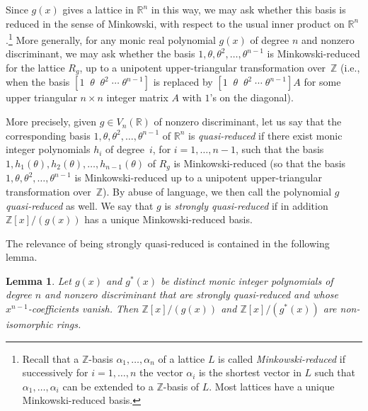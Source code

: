 \documentclass[11pt]{article}
\def\Z{{\mathbb Z}}
\def\R{{\mathbb R}}
\def\Vmn{{V_n}}
\def\Z{{\mathbb Z}}
\newtheorem{lemma}[theorem]{Lemma}
\begin{document}
Since $g(x)$ gives a lattice in $\R^n$ in this way, we may ask whether
this basis is reduced in the sense of Minkowski, with respect to the
usual inner product on $\R^n$.\footnote{Recall that a $\Z$-basis
  $\alpha_1,\ldots,\alpha_n$ of a lattice $L$ is called {\it
    Minkowski-reduced} if successively for $i=1,\ldots, n$ the vector
  $\alpha_i$ is the shortest vector in $L$ such that
  $\alpha_1,\ldots,\alpha_i$ can be extended to a $\Z$-basis of
  $L$. Most lattices have a unique Minkowski-reduced basis.}  More
generally, for any monic real polynomial $g(x)$ of degree $n$ and
nonzero discriminant, we may ask whether the basis
$1,\theta,\theta^2,\ldots,\theta^{n-1}$ is Minkowski-reduced for the
lattice $R_g$, up to a unipotent upper-triangular transformation
over~$\Z$ (i.e., when the basis $[1\;\;\theta\;\;\theta^2\;\cdots\;
  \theta^{n-1}]$ is replaced by $[1\;\;\theta\;\;\theta^2\;\cdots\;
  \theta^{n-1}]A$ for some upper triangular $n\times n$ integer matrix
$A$ with $1$'s on the diagonal).

More precisely, given $g\in \Vmn(\R)$ of nonzero discriminant, let us
say that the corresponding basis
$1,\theta,\theta^2,\ldots,\theta^{n-1}$ of $\R^n$ is {\it
  quasi-reduced} if there exist monic integer polynomials $h_i$ of
degree~$i$, for $i=1,\ldots,n-1$, such that the basis
$1,h_1(\theta),h_2(\theta),\ldots,h_{n-1}(\theta)$ of $R_g$ is
Minkowski-reduced (so that the basis
$1,\theta,\theta^2,\ldots,\theta^{n-1}$ is Minkowski-reduced up to a unipotent
upper-triangular transformation over~$\Z$). By abuse of language, we
then call the polynomial $g$ {\it quasi-reduced} as well. We say that
$g$ is {\it strongly quasi-reduced} if in addition $\Z[x]/(g(x))$ has
a unique Minkowski-reduced basis.

The relevance of being strongly quasi-reduced is contained in the
following lemma.

\begin{lemma}\label{reducedg}
Let $g(x)$ and $g^*(x)$ be distinct monic integer polynomials of
degree $n$ and nonzero discriminant that are strongly quasi-reduced
and whose $x^{n-1}$-coefficients vanish.  Then $\Z[x]/(g(x))$ and
$\Z[x]/(g^*(x))$ are non-isomorphic rings.
\end{lemma}
\end{document}
